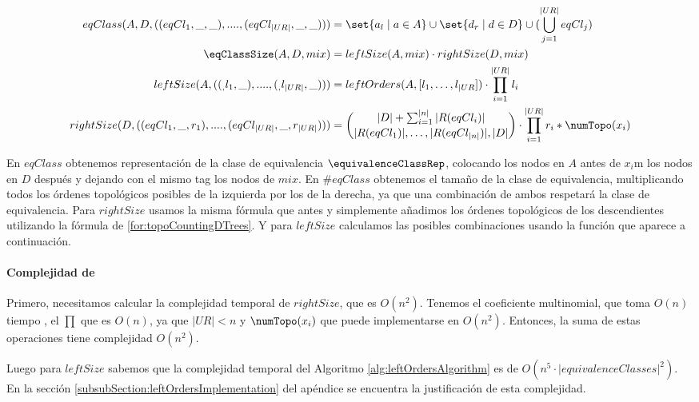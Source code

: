 \begin{align*}
eqClass(A, D, ((eqCl_1, \_ , \_ ), ...., (eqCl_{|UR|}, \_ , \_))) 
    &=  \set{a_l \mid a \in A} \cup \set{d_r \mid d \in D} \cup (\bigcup_{j=1}^{|UR|} eqCl_j) \\ 
\eqClassSize(A, D, mix) 
    &= leftSize(A,mix) \cdot rightSize(D, mix)  \\ 
leftSize(A, ((_, l_1, \_), ...., (_, l_{|UR|}, \_))) 
    &= leftOrders(A, [ l_1, \dots, l_{|UR}]) \cdot \prod_{i=1}^{|UR|} l_i  \\
rightSize(D, ((eqCl_1, \_, r_1), ...., (eqCl_{|UR|}, \_, r_{|UR|} ))) 
    &= \binom{|D| + \sum_{i=1}^{|n|} |R(eqCl_i)|}{|R(eqCl_1)|, \ldots, |R(eqCl_{|n|})|, |D|} \cdot \prod_{i=1}^{|UR|} r_i * \numTopo(x_i)
\end{align*}


En $eqClass$ obtenemos representación de la clase de equivalencia $\equivalenceClassRep$, colocando los nodos en $A$ antes de $x_i$m los nodos en $D$ después y dejando con el mismo tag los nodos de $mix$. En $\#eqClass$ obtenemos el tamaño de la clase de equivalencia, multiplicando todos los órdenes topológicos posibles de la izquierda por los de la derecha, ya que una combinación de ambos respetará la clase de equivalencia. Para $rightSize$ usamos la misma fórmula que antes y simplemente añadimos los órdenes topológicos de los descendientes utilizando la fórmula de \ref{for:topoCountingDTrees}. Y para $leftSize$ calculamos las posibles combinaciones usando la función que aparece a continuación.

\paragraph{Complejidad de \eqClassSize} \label{subsubSection:eqClassComplexity}

Primero, necesitamos calcular la complejidad temporal de $rightSize$, que es $O(n^2)$. Tenemos el coeficiente multinomial, que toma $O(n)$ tiempo , el $\prod$ que es $O(n)$, ya que $|UR|<n$ y $\numTopo(x_i)$ que puede implementarse en $O(n^2)$. Entonces, la suma de estas operaciones tiene complejidad $O(n^2)$.


Luego para $leftSize$ sabemos que la complejidad temporal del Algoritmo \ref{alg:leftOrdersAlgorithm} es de $O(n^5 \cdot |equivalenceClasses|^2)$. En la sección \ref{subsubSection:leftOrdersImplementation} del apéndice se encuentra la justificación de esta complejidad. 

